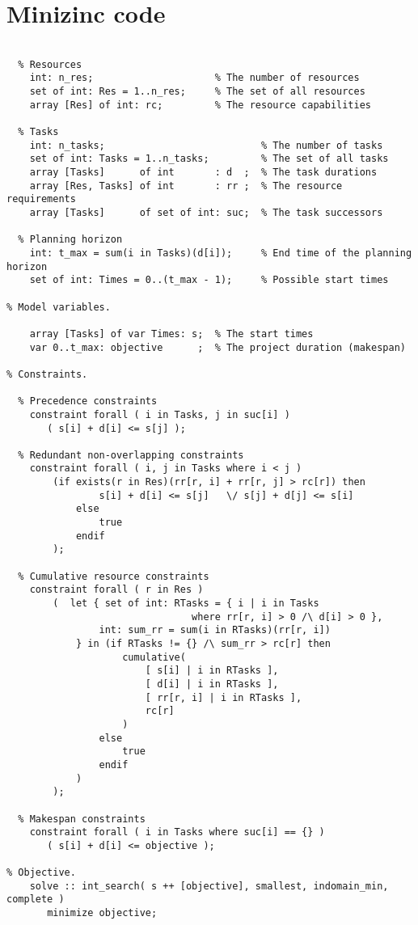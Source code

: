 \onecolumn
\section{Minizinc code}\label{lst:minizinc-rcpsp}
\begin{lstlisting}[caption={\lstinline|rcpsp.mzn|. Minizic Code for the RSPCP}]
% Model parameters.

  % Resources
    int: n_res;                     % The number of resources
    set of int: Res = 1..n_res;     % The set of all resources
    array [Res] of int: rc;         % The resource capabilities

  % Tasks
    int: n_tasks;                           % The number of tasks
    set of int: Tasks = 1..n_tasks;         % The set of all tasks
    array [Tasks]      of int       : d  ;  % The task durations
    array [Res, Tasks] of int       : rr ;  % The resource requirements
    array [Tasks]      of set of int: suc;  % The task successors

  % Planning horizon
    int: t_max = sum(i in Tasks)(d[i]);     % End time of the planning horizon
    set of int: Times = 0..(t_max - 1);     % Possible start times

% Model variables.

    array [Tasks] of var Times: s;  % The start times
    var 0..t_max: objective      ;  % The project duration (makespan)

% Constraints.

  % Precedence constraints
    constraint forall ( i in Tasks, j in suc[i] )
       ( s[i] + d[i] <= s[j] );

  % Redundant non-overlapping constraints
    constraint forall ( i, j in Tasks where i < j )
        (if exists(r in Res)(rr[r, i] + rr[r, j] > rc[r]) then
                s[i] + d[i] <= s[j]   \/ s[j] + d[j] <= s[i]
            else
                true
            endif
        );

  % Cumulative resource constraints
    constraint forall ( r in Res )
        (  let { set of int: RTasks = { i | i in Tasks
                                where rr[r, i] > 0 /\ d[i] > 0 },
                int: sum_rr = sum(i in RTasks)(rr[r, i])
            } in (if RTasks != {} /\ sum_rr > rc[r] then
                    cumulative(
                        [ s[i] | i in RTasks ],
                        [ d[i] | i in RTasks ],
                        [ rr[r, i] | i in RTasks ],
                        rc[r]
                    )
                else
                    true
                endif
            )
        );

  % Makespan constraints
    constraint forall ( i in Tasks where suc[i] == {} )
       ( s[i] + d[i] <= objective );

% Objective.
    solve :: int_search( s ++ [objective], smallest, indomain_min, complete )
       minimize objective;
\end{lstlisting}

